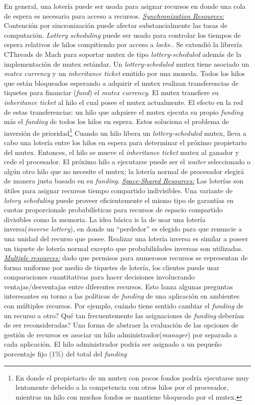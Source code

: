 En general, una lotería puede ser usada para asignar recursos en donde una cola de espera es necesaria para acceso a recursos. \underline{\textit{Synchronization Resources:}} Contención por sincronización puede afectar substancialmente las tasas de computación. \textit{Lottery scheduling} puede ser usado para controlar los tiempos de espera relativos de hilos compitiendo por acceso a \textit{locks.}. Se extendió la librería CThreads de Mach para soportar mutex de tipo \textit{lottery-scheduled} además de la implementación de mutex estándar. Un \textit{lottery-scheduled} mutex tiene asociado un \textit{mutex currency} y un \textit{inheritance ticket} emitido por una moneda. Todos los hilos que están bloqueados esperando a adquirir el mutex realizan transferencias de tiquetes para financiar (\textit{fund}) el \textit{mutex currency}. El mutex transfiere su \textit{inheritance ticket} al hilo el cual posee el mutex actualmente. El efecto en la red de estas transferencias: un hilo que adquiere el mutex ejecuta su propio \textit{funding} más el \textit{funding} de todos los hilos en espera. Estos soluciona el problema de inversión de prioridad\footnote{En donde el propietario de un mutex con pocos fondos podría ejecutarse muy lentamente debeido a la competencia con otros hilos por el procesador, mientras un hilo con muchos fondos se mantiene bloqueado por el mutex.} Cuando un hilo libera un \textit{lottery-scheduled} mutex, lleva a cabo una lotería entre los hilos en espera para determinar el próximo propietario del mutex. Entonces, el hilo se mueve el \textit{inheritance ticket} mutex al ganador y cede el procesador. El próximo hilo a ejecutarse puede ser el \textit{waiter} seleccionado o algún otro hilo que no necesite el mutex; la lotería normal de procesador elegirá de manera justa basado en su \textit{funding}. \underline{\textit{Space-Shared Resources:}} Las loterías son útiles para asignar recursos tiempo compartido indivisibles. Una variante de \textit{lotery scheduling} puede proveer eficientemente el mismo tipo de garantías en cuotas proporcionale probabilísticas para recursos de espacio compartido divisibles como la memoria. La idea básica is la de usar una lotería inversa(\textit{inverse lottery}), en donde un ``perdedor'' es elegido para que renuncie a una unidad del recurso que posee. Realizar una lotería inversa es similar a poseer un tiquete de lotería normal excepto que probabilidades inversas son utilizadas. \underline{\textit{Multiple resources:}} dado que permisos para numerosos recursos se representan de forma uniforme por medio de tiquetes de lotería, los clientes puede usar comparaciones cuantitativas para hacer decisiones involucrando ventajas/desventajas entre diferentes recursos. Esto lanza algunas preguntas interesantes en torno a las políticas de \textit{funding} de una aplicación en ambientes con múltiples recursos. Por ejemplo, cuándo tiene sentido cambiar el \textit{funding} de un recurso a otro? Qué tan frecuentemente las asignaciones de \textit{funding} deberían de ser reconsideradas? Una forma de abstraer la evaluación de las opciones de gestión de recursos es asociar un hilo administrador(\textit{manager}) por separado a cada aplicación. El hilo administrador podría ser asignado a un pequeño porcentaje fijo (1\%) del total del \textit{funding} 